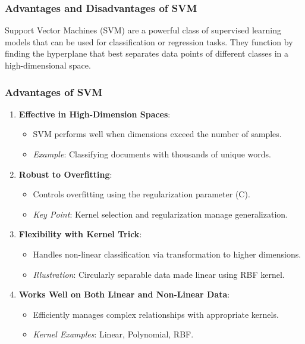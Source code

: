 \documentclass[aspectratio=169]{beamer}
\begin{document}
\begin{frame}[fragile]
    \frametitle{Advantages and Disadvantages of SVM}
    Support Vector Machines (SVM) are a powerful class of supervised learning models that can be used for classification or regression tasks.
    They function by finding the hyperplane that best separates data points of different classes in a high-dimensional space.
\end{frame}

\begin{frame}[fragile]
    \frametitle{Advantages of SVM}
    \begin{enumerate}
        \item \textbf{Effective in High-Dimension Spaces}:
            \begin{itemize}
                \item SVM performs well when dimensions exceed the number of samples.
                \item \textit{Example}: Classifying documents with thousands of unique words.
            \end{itemize}
            
        \item \textbf{Robust to Overfitting}:
            \begin{itemize}
                \item Controls overfitting using the regularization parameter (C).
                \item \textit{Key Point}: Kernel selection and regularization manage generalization.
            \end{itemize}

        \item \textbf{Flexibility with Kernel Trick}:
            \begin{itemize}
                \item Handles non-linear classification via transformation to higher dimensions.
                \item \textit{Illustration}: Circularly separable data made linear using RBF kernel.
            \end{itemize}
            
        \item \textbf{Works Well on Both Linear and Non-Linear Data}:
            \begin{itemize}
                \item Efficiently manages complex relationships with appropriate kernels.
                \item \textit{Kernel Examples}: Linear, Polynomial, RBF.
            \end{itemize}
            

\end{enumerate}
\end{frame}
\end{document}
